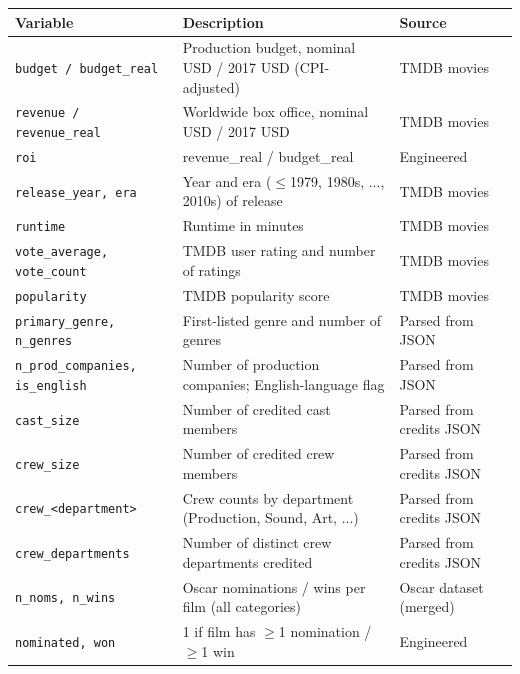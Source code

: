 \begin{tabular}{p{}p{}p{}}
\toprule
Variable & Description & Source \\
\midrule
\texttt{budget / budget\_real} & Production budget, nominal USD / 2017 USD (CPI-adjusted) & TMDB movies \\
\texttt{revenue / revenue\_real} & Worldwide box office, nominal USD / 2017 USD & TMDB movies \\
\texttt{roi} & revenue\_real / budget\_real & Engineered \\
\texttt{release\_year, era} & Year and era ($\leq$1979, 1980s, ..., 2010s) of release & TMDB movies \\
\texttt{runtime} & Runtime in minutes & TMDB movies \\
\texttt{vote\_average, vote\_count} & TMDB user rating and number of ratings & TMDB movies \\
\texttt{popularity} & TMDB popularity score & TMDB movies \\
\texttt{primary\_genre, n\_genres} & First-listed genre and number of genres & Parsed from JSON \\
\texttt{n\_prod\_companies, is\_english} & Number of production companies; English-language flag & Parsed from JSON \\
\texttt{cast\_size} & Number of credited cast members & Parsed from credits JSON \\
\texttt{crew\_size} & Number of credited crew members & Parsed from credits JSON \\
\texttt{crew\_<department>} & Crew counts by department (Production, Sound, Art, ...) & Parsed from credits JSON \\
\texttt{crew\_departments} & Number of distinct crew departments credited & Parsed from credits JSON \\
\texttt{n\_noms, n\_wins} & Oscar nominations / wins per film (all categories) & Oscar dataset (merged) \\
\texttt{nominated, won} & 1 if film has $\geq$1 nomination / $\geq$1 win & Engineered \\
\bottomrule
\end{tabular}